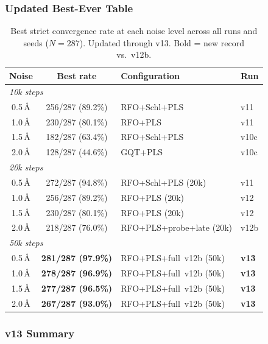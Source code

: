 \documentclass[11pt,a4paper]{article}
\theoremstyle{definition}
\begin{document}
\subsubsection{Updated Best-Ever Table}
\label{sec:v13-best-ever}

\begin{table}[h]
\centering
\caption{Best strict convergence rate at each noise level across all runs
  and seeds ($N=287$).  Updated through v13.  Bold = new record vs.\ v12b.}
\label{tab:best-ever-v13}
\begin{tabular}{ccll}
\toprule
Noise & Best rate & Configuration & Run \\
\midrule
\multicolumn{4}{l}{\emph{10k steps}} \\
0.5\,\AA & 256/287 (89.2\%) & RFO+Schl+PLS       & v11 \\
1.0\,\AA & 230/287 (80.1\%) & RFO+PLS             & v11 \\
1.5\,\AA & 182/287 (63.4\%) & RFO+Schl+PLS        & v10c \\
2.0\,\AA & 128/287 (44.6\%) & GQT+PLS             & v10c \\
\midrule
\multicolumn{4}{l}{\emph{20k steps}} \\
0.5\,\AA & 272/287 (94.8\%) & RFO+Schl+PLS (20k)  & v11 \\
1.0\,\AA & 256/287 (89.2\%) & RFO+PLS (20k)        & v12 \\
1.5\,\AA & 230/287 (80.1\%) & RFO+PLS (20k)        & v12 \\
2.0\,\AA & 218/287 (76.0\%) & RFO+PLS+probe+late (20k) & v12b \\
\midrule
\multicolumn{4}{l}{\emph{50k steps}} \\
0.5\,\AA & \textbf{281/287 (97.9\%)} & RFO+PLS+full~v12b (50k) & \textbf{v13} \\
1.0\,\AA & \textbf{278/287 (96.9\%)} & RFO+PLS+full~v12b (50k) & \textbf{v13} \\
1.5\,\AA & \textbf{277/287 (96.5\%)} & RFO+PLS+full~v12b (50k) & \textbf{v13} \\
2.0\,\AA & \textbf{267/287 (93.0\%)} & RFO+PLS+full~v12b (50k) & \textbf{v13} \\
\bottomrule
\end{tabular}
\end{table}

\subsubsection{v13 Summary}
\label{sec:v13-summary}
\end{document}
